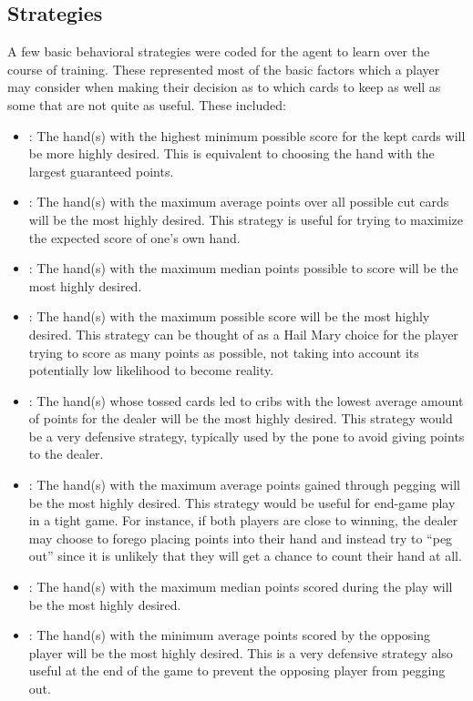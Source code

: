 
\subsection{Strategies}
\label{sec:dm-methods-strategies}


A few basic behavioral strategies were coded for the agent to learn
over the course of training.
%
These represented most of the basic factors which a player may consider when
making their decision as to which cards to keep
as well as some that are not quite as useful.
%
These included:
\begin{itemize}
\item \handmaxmin:
	The hand(s) with the highest minimum possible score for the kept cards
	will be more highly desired.
	This is equivalent to choosing the hand with the largest guaranteed points.
\item \handmaxavg:
	The hand(s) with the maximum average points over all possible cut cards will
	be the most highly desired.
	This strategy is useful for trying to maximize the expected score of one's
	own hand.
\item \handmaxmed:
	The hand(s) with the maximum median points possible to score will be the most
	highly desired.
\item \handmaxposs:
	The hand(s) with the maximum possible score will be the most highly desired.
	This strategy can be thought of as a Hail Mary choice for the player trying
	to score as many points as possible, not taking into account its
	potentially low likelihood to become reality.
\item \cribminavg:
	The hand(s) whose tossed cards led to cribs with the lowest average amount
	of points for the dealer will be
	the most highly desired.
	This strategy would be a very defensive strategy,
	typically used by the pone to avoid giving points to the dealer.
\item \peggingmaxavggained:
	The hand(s) with the maximum average points gained through pegging
	will be the most highly desired.
	This strategy would be useful for end-game play in a tight game.
	For instance, if both players are close to winning, the dealer may
	choose to forego placing points into their hand and instead try to
		``peg out''
	since it is unlikely that they will get a chance to count their hand at all.
\item \peggingmaxmedgained:
	The hand(s) with the maximum median points scored during the play
	will be the most highly desired.
\item \peggingminavggiven:
	The hand(s) with the minimum average points scored by the opposing player
	will be the most highly desired.
	This is a very defensive strategy also useful at the end of the game to
	prevent the opposing player from pegging out.
\end{itemize}

